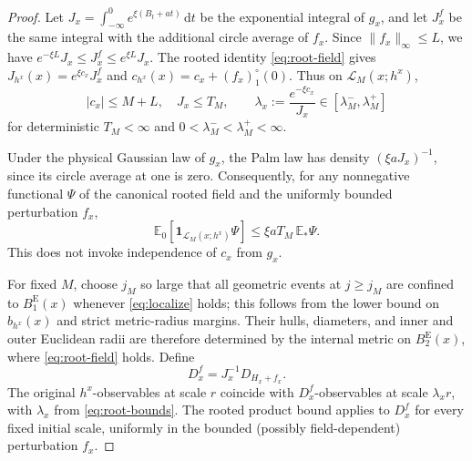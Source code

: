 \documentclass[11pt,reqno]{amsart}
\theoremstyle{plain}
\theoremstyle{definition}
\theoremstyle{remark}
\newcommand{\E}{\mathbb E}
\newcommand{\1}{\mathbf{1}}
\newcommand{\dd}{\,\mathrm d}
\newcommand{\Be}{B^{\mathrm E}}
\begin{document}
\begin{proof}
Let $J_x=\int_{-\infty}^0e^{\xi(B_t+at)}\dd t$ be the exponential integral of $g_x$, and let $J_x^f$ be the same integral with the additional circle average of $f_x$. Since $\|f_x\|_\infty\le L$, we have $e^{-\xi L}J_x\le J_x^f\le e^{\xi L}J_x$. The rooted identity \eqref{eq:root-field} gives $J_{h^x}(x)=e^{\xi c_x}J_x^f$ and $c_{h^x}(x)=c_x+(f_x)_1^\circ(0)$. Thus on $\mathcal L_M(x;h^x)$,
\begin{equation}\label{eq:root-bounds}
|c_x|\le M+L,\quad J_x\le T_M,
\qquad \lambda_x:=\frac{e^{-\xi c_x}}{J_x}\in[\lambda_M^-,\lambda_M^+]
\end{equation}
for deterministic $T_M<\infty$ and $0<\lambda_M^-<\lambda_M^+<\infty$.

Under the physical Gaussian law of $g_x$, the Palm law has density $(\xi aJ_x)^{-1}$, since its circle average at one is zero. Consequently, for any nonnegative functional $\Psi$ of the canonical rooted field and the uniformly bounded perturbation $f_x$,
\begin{equation}\label{eq:palm-convert}
\E_0[\1_{\mathcal L_M(x;h^x)}\Psi]\le\xi aT_M\,\E_*\Psi.
\end{equation}
This does not invoke independence of $c_x$ from $g_x$.

For fixed $M$, choose $j_M$ so large that all geometric events at $j\ge j_M$ are confined to $\Be_1(x)$ whenever \eqref{eq:localize} holds; this follows from the lower bound on $b_{h^x}(x)$ and strict metric-radius margins. Their hulls, diameters, and inner and outer Euclidean radii are therefore determined by the internal metric on $\Be_2(x)$, where \eqref{eq:root-field} holds. Define
\[
D_x^f=J_x^{-1}D_{H_x+f_x}.
\]
The original $h^x$-observables at scale $r$ coincide with $D_x^f$-observables at scale $\lambda_xr$, with $\lambda_x$ from \eqref{eq:root-bounds}. The rooted product bound applies to $D_x^f$ for every fixed initial scale, uniformly in the bounded (possibly field-dependent) perturbation $f_x$.


\end{proof}
\end{document}
